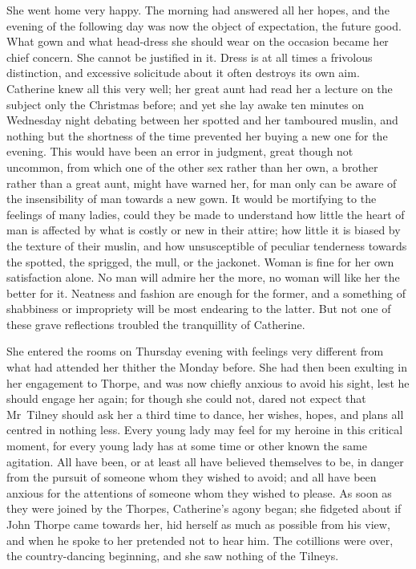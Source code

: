  She went home very happy. The morning had answered all her hopes, and the evening of the following day was now the object of expectation, the future good. What gown and what head-dress she should wear on the occasion became her chief concern. She cannot be justified in it. Dress is at all times a frivolous distinction, and excessive solicitude about it often destroys its own aim. Catherine knew all this very well; her great aunt had read her a lecture on the subject only the Christmas before; and yet she lay awake ten minutes on Wednesday night debating between her spotted and her tamboured muslin, and nothing but the shortness of the time prevented her buying a new one for the evening. This would have been an error in judgment, great though not uncommon, from which one of the other sex rather than her own, a brother rather than a great aunt, might have warned her, for man only can be aware of the insensibility of man towards a new gown. It would be mortifying to the feelings of many ladies, could they be made to understand how little the heart of man is affected by what is costly or new in their attire; how little it is biased by the texture of their muslin, and how unsusceptible of peculiar tenderness towards the spotted, the sprigged, the mull, or the jackonet. Woman is fine for her own satisfaction alone. No man will admire her the more, no woman will like her the better for it. Neatness and fashion are enough for the former, and a something of shabbiness or impropriety will be most endearing to the latter. But not one of these grave reflections troubled the tranquillity of Catherine. 

 She entered the rooms on Thursday evening with feelings very different from what had attended her thither the Monday before. She had then been exulting in her engagement to Thorpe, and was now chiefly anxious to avoid his sight, lest he should engage her again; for though she could not, dared not expect that Mr~Tilney should ask her a third time to dance, her wishes, hopes, and plans all centred in nothing less. Every young lady may feel for my heroine in this critical moment, for every young lady has at some time or other known the same agitation. All have been, or at least all have believed themselves to be, in danger from the pursuit of someone whom they wished to avoid; and all have been anxious for the attentions of someone whom they wished to please. As soon as they were joined by the Thorpes, Catherine's agony began; she fidgeted about if John Thorpe came towards her, hid herself as much as possible from his view, and when he spoke to her pretended not to hear him. The cotillions were over, the country-dancing beginning, and she saw nothing of the Tilneys. 

